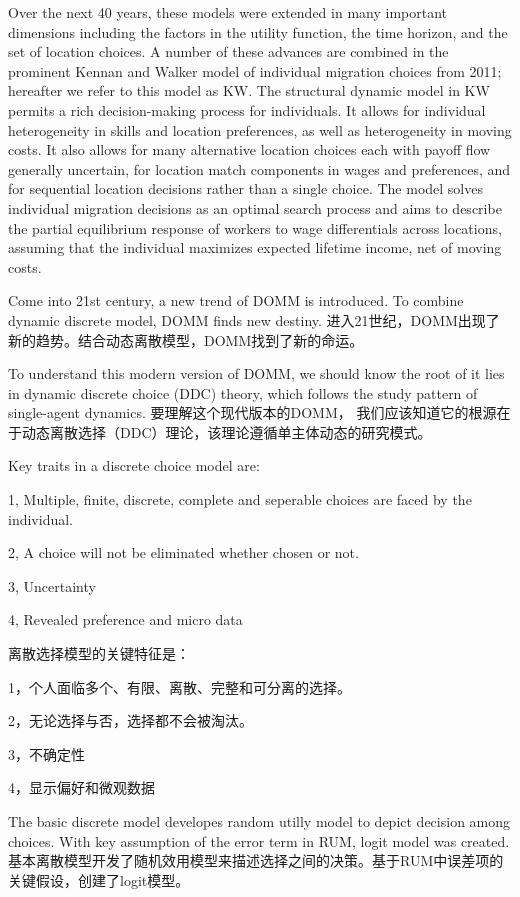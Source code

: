 \documentclass[a4paper,12pt,oneside]{book} %
\begin{document}
Over the next 40 years, these models were extended in many important dimensions including the  factors in the utility function, the time horizon, and the set of location choices. A number of these  advances are combined in the prominent Kennan and Walker model of individual migration choices  from 2011; hereafter we refer to this model as KW. The structural dynamic model in KW permits a  rich decision-making process for individuals. It allows for individual heterogeneity in skills and  location preferences, as well as heterogeneity in moving costs. It also allows for many alternative  location choices each with payoff flow generally uncertain, for location match components in wages  and preferences, and for sequential location decisions rather than a single choice. The model solves  individual migration decisions as an optimal search process and aims to describe the partial  equilibrium response of workers to wage differentials across locations, assuming that the individual  maximizes expected lifetime income, net of moving costs.



Come into 21st century, a new trend of DOMM is introduced. To combine dynamic discrete model, DOMM finds new destiny.
进入21世纪，DOMM出现了新的趋势。结合动态离散模型，DOMM找到了新的命运。

To understand this modern version of DOMM, 
we should know the root of it lies in dynamic discrete choice (DDC) theory, which follows the study pattern of single-agent dynamics.
要理解这个现代版本的DOMM，
我们应该知道它的根源在于动态离散选择（DDC）理论，该理论遵循单主体动态的研究模式。



Key traits in a discrete choice model are:

1, Multiple, finite, discrete, complete and seperable choices are faced by the individual.

2, A choice will not be eliminated whether chosen or not.

3, Uncertainty

4, Revealed preference and micro data

离散选择模型的关键特征是：

1，个人面临多个、有限、离散、完整和可分离的选择。

2，无论选择与否，选择都不会被淘汰。

3，不确定性

4，显示偏好和微观数据

The basic discrete model developes random utilly model to depict decision among choices. With key assumption of the error term in RUM, logit model was created. 
基本离散模型开发了随机效用模型来描述选择之间的决策。基于RUM中误差项的关键假设，创建了logit模型。
\end{document}
